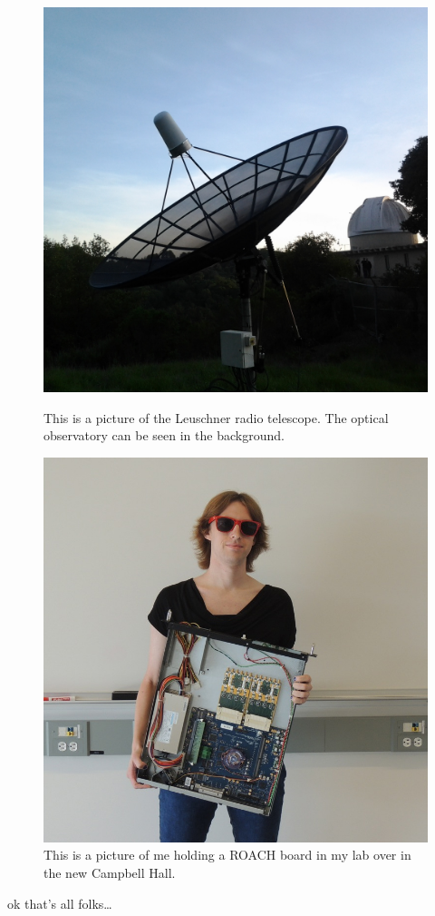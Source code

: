 \documentclass[12pt,letterpaper]{article}
\begin{document}
\begin{figure}[H]
    \centering
    \begin{minipage}[t]{0.475\textwidth}
        \centering
        \includegraphics[width=\textwidth]{leuschner.jpg}
        \caption{This is a picture of the Leuschner radio telescope. The
        optical observatory can be seen in the background.}
    \end{minipage}
    \begin{minipage}[t]{0.475\textwidth}
        \centering
        \includegraphics[width=\textwidth]{roach.jpg}
        \caption{This is a picture of me holding a ROACH board in my lab over in
        the new Campbell Hall.}
    \end{minipage}
\end{figure}

ok that's all folks\dots
\end{document}
